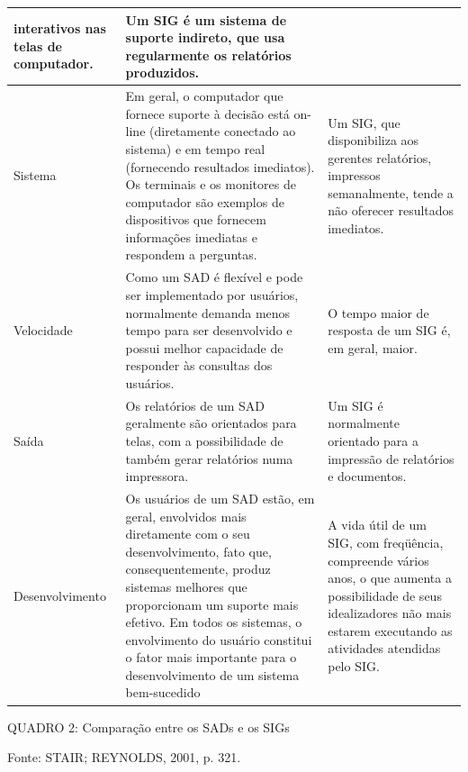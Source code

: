 \documentclass[a4paper]{article}
\begin{document}
\begin{flushleft}
\begin{supertabular}{|m{3.0509999cm}|m{7.051cm}|m{5.5610003cm}|}
{{interativos nas telas de computador.}} &
{\sffamily Um SIG \'e um sistema de suporte indireto, que usa regularmente os relat\'orios
produzidos.}\\\hline
{\sffamily Sistema} &
{\sffamily Em geral, o computador que fornece suporte \`a decis\~ao est\'a on-line (diretamente
conectado ao sistema) e em tempo real (fornecendo resultados imediatos). Os terminais e os monitores de computador
s\~ao exemplos de dispositivos que fornecem informa\c{c}\~oes imediatas e respondem a perguntas.} &
{\sffamily Um SIG, que disponibiliza aos gerentes relat\'orios, impressos semanalmente, tende a
n\~ao oferecer resultados imediatos.}\\\hline
{\sffamily Velocidade} &
{ \textsf{Como um SAD \'e flex\'ivel e pode ser implementado por usu\'arios, normalmente
demanda menos tempo para ser desenvolvido e possui melhor capacidade de responder \`as consultas dos usu\'arios.}} &
{\sffamily O tempo maior de resposta de um SIG \'e, em geral, maior.}\\\hline
{\sffamily Sa\'ida} &
{ \textsf{Os relat\'orios de um SAD geralmente s\~ao orientados para telas, com a possibilidade
de tamb\'em gerar relat\'orios numa impressora.}} &
{\sffamily Um SIG \'e normalmente orientado para a impress\~ao de relat\'orios e
documentos.}\\\hline
{\sffamily Desenvolvimento} &
{ \textsf{Os usu\'arios de um SAD est\~ao, em geral, envolvidos mais diretamente com o seu
desenvolvimento, fato que, consequentemente, produz sistemas melhores que proporcionam um suporte mais efetivo. Em
todos os sistemas, o envolvimento do usu\'ario constitui o fator mais importante para o desenvolvimento de um sistema
bem-sucedido}} &
{\sffamily A vida \'util de um SIG, com freq\"u\^encia, compreende v\'arios anos, o que aumenta
a possibilidade de seus idealizadores n\~ao mais estarem executando as atividades atendidas pelo SIG.}\\\hline
\end{supertabular}
\end{flushleft}
{
\textsf{QUADRO 2: Compara\c{c}\~ao entre os SADs e os SIGs }}

{\sffamily
Fonte: STAIR; REYNOLDS, 2001, p. 321. }
\end{document}
